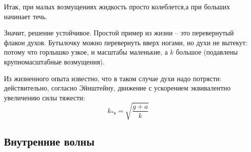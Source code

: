 Итак, при малых возмущениях жидкость просто колеблется,а при больших начинает течь.

Значит, решение устойчивое. Простой пример из жизни -- это перевернутый флакон духов. Бутылочку можно перевернуть вверх ногами, но духи не вытекут:
потому что горлышко узкое, и масштабы маленькие, а $k$ большое (подавлены крупномасштабные возмущения). 

Из жизненного опыта известно, что в таком случае духи надо потрясти: действительно, согласно Эйнштейну, движение с ускорением эквивалентно увеличению силы тяжести:
\begin{equation}
    k_{*\text{э}} = \sqrt{\frac{g+a}{k}}
\end{equation}

\newpage
\subsection{Внутренние волны}





